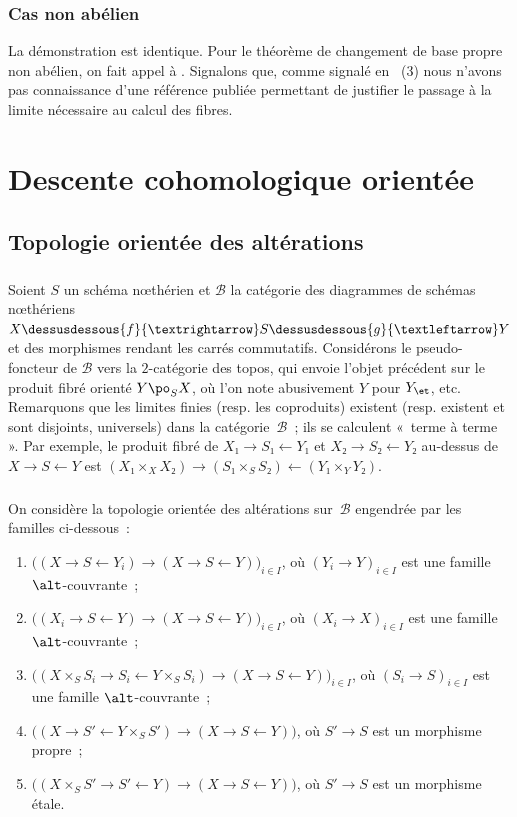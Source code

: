 \documentclass[10pt]{../fichiers-configuration-latex/smfart}
\begin{document}
\subsubsection{Cas non abélien}
\label{12-remarque-cas-non-abélien}
La démonstration est identique. Pour le théorème de changement de base
propre non abélien, on fait appel à \cite[VII.2.2.2]{CNA@Giraud}.
Signalons que, comme signalé en  (3)
nous n'avons pas connaissance d'une référence publiée
permettant de justifier le passage à la limite nécessaire au
calcul des fibres.

\section{Descente cohomologique orientée}

\subsection{Topologie orientée des altérations}
\subsubsection{}
Soient $S$ un schéma nœthérien et $ℬ$ la catégorie des diagrammes de schémas
nœthériens $X\dessusdessous{f}{→} S \dessusdessous{g}{←} Y$ et des
morphismes rendant les carrés commutatifs.
Considérons le pseudo-foncteur de $ℬ$ vers la $2$-catégorie
des topos, qui envoie l'objet précédent sur le produit
fibré orienté $Y\po_S X$, où l'on note abusivement $Y$ pour $Y_\et$, etc.
Remarquons que les limites finies (resp. les coproduits) existent
(resp. existent et sont disjoints, universels) dans la
catégorie $ℬ$ ; ils se calculent « terme à terme ». Par exemple,
le produit fibré de $X₁→S₁←Y₁$ et $X₂→S₂←Y₂$ au-dessus de $X→S←Y$
est $(X₁×_X X₂)→ (S₁×_S S₂) ← (Y₁×_Y Y₂)$.

\subsubsection{}
\label{12-topologie alt-orientée}
On considère la topologie orientée des altérations sur $ℬ$ engendrée
par les familles ci-dessous :

\begin{enumerate}
\item $\big((X→S←Y_i) → (X→S←Y)\big)_{i∈I}$, où $(Y_i→Y)_{i∈I}$ est une famille
$\alt$-couvrante ;
\item $\big((X_i→S←Y) → (X→S←Y)\big)_{i∈I}$, où $(X_i→X)_{i∈I}$ est
une famille $\alt$-couvrante ;
\item $\big((X×_S S_i → S_i ← Y×_S S_i) → (X→S←Y)\big)_{i∈I}$, où
$(S_i→S)_{i∈I}$ est une famille $\alt$-couvrante ;
\item $\big((X → S' ← Y×_S S') → (X→S←Y)\big)$, où $S'→S$ est un morphisme propre ;
\item $\big((X×_S S' → S' ← Y)→ (X→S←Y)\big)$, où $S'→S$ est un morphisme étale.
\end{enumerate}
\end{document}

